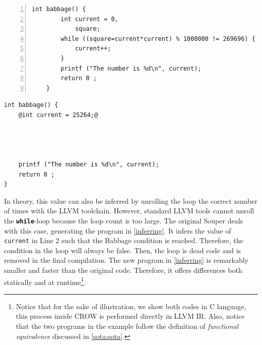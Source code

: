 {


\begin{minipage}[t]{0.47\linewidth}
    \begin{lstlisting}[numbers=left]
    int babbage() {
        int current = 0,
            square;
        while ((square=current*current) % 1000000 != 269696) {
            current++;
        }
        printf ("The number is %d\n", current);
        return 0 ;
    }
    \end{lstlisting}
\end{minipage}
\begin{minipage}[t]{0.48\linewidth}
    \begin{lstlisting}[]
int babbage() {
    @int current = 25264;@
    
    


    printf ("The number is %d\n", current);
    return 0 ;
}
    \end{lstlisting}
\end{minipage}
}
In theory, this value can also be inferred by unrolling the loop the correct number of times with the LLVM toolchain.
However, standard LLVM tools cannot unroll the \texttt{\textbf{while}}-loop because the loop count is too large.
The original Souper deals with this case, generating the program in \autoref{inferring}. It infers the value of \texttt{current} in Line 2 such that the Babbage condition is reached. Therefore, the condition in the loop will always be false. Then, the loop is dead code and is removed in the final compilation. 
The new program in \autoref{inferring} is remarkably smaller and faster than the original code. Therefore, it offers differences both statically and at runtime\footnote{ Notice that for the sake of illustration, we show both codes in C language, this process inside CROW is performed directly in LLVM IR. Also, notice that the two programs in the example follow the definition of \emph{functional equivalence} discussed in \autoref{sota:sota}.}.




